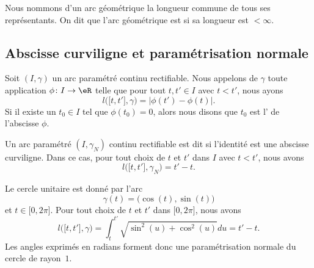 \begin{definition}
    Nous nommons  d'un arc géométrique la longueur commune de tous ses représentants. On dit que l'arc géométrique est  si sa longueur est $<\infty$.
\end{definition}

\subsection{Abscisse curviligne et paramétrisation normale}     \label{SubSecAbsCurv}

\begin{definition}
Soit $(I,\gamma)$ un arc paramétré continu rectifiable. Nous appelons  de $\gamma$ toute application $\phi\colon I\to \eR$ telle que pour tout $t,t'\in I$ avec $t<t'$, nous ayons
\begin{equation}
    l\big( \mathopen[ t,t'  \mathclose],\gamma\big) = \big|  \phi(t')-\phi(t) \big|.
\end{equation}
Si il existe un $t_0\in I$ tel que $\phi(t_0)=0$, alors nous disons que $t_0$ est l' de l'abscisse $\phi$.

Un arc paramétré $(I,\gamma_N)$ continu rectifiable est dit  si l'identité est une abscisse curviligne. Dans ce cas, pour tout choix de $t$ et $t'$ dans $I$ avec $t<t'$, nous avons 
\begin{equation}
    l\big( \mathopen[ t , t' \mathclose],\gamma_N \big)=t'-t.
\end{equation}
\end{definition}

%
%

\begin{example}     \label{ExCerlceRadNorm}
Le cercle unitaire est donné par l'arc
\begin{equation}
    \gamma(t)=\big( \cos(t),\sin(t) \big)
\end{equation}
et $t\in\mathopen[ 0 , 2\pi \mathclose]$. Pour tout choix de $t$ et $t'$ dans $\mathopen[ 0 , 2\pi \mathclose]$, nous avons
\begin{equation}
    l\big( \mathopen[ t , t' \mathclose],\gamma \big)=\int_t^{t'}\sqrt{\sin^2(u)+\cos^2(u)}du=t'-t.
\end{equation}
Les angles exprimés en radians forment donc une paramétrisation normale du cercle de rayon~$1$.
\end{example}

